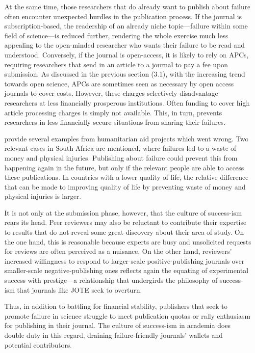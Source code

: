 \documentclass{article}
\begin{document}
At the same time, those researchers that do already want to publish about failure often encounter unexpected hurdles in the publication process. If the journal is subscription-based, the readership of an already niche topic—failure within some field of science—is reduced further, rendering the whole exercise much less appealing to the open-minded researcher who wants their failure to be read and understood. Conversely, if the journal is open-access, it is likely to rely on APCs, requiring researchers that send in an article to a journal to pay a fee upon submission. As discussed in the previous section (3.1), with the increasing trend towards open science, APCs are sometimes seen as necessary by open access journals to cover costs. However, these charges selectively disadvantage researchers at less financially prosperous institutions. Often funding to cover high article processing charges is simply not available. This, in turn, prevents researchers in less financially secure situations from sharing their failures.

\parencite{Sindall2020} provide several examples from humanitarian aid projects which went wrong. Two relevant cases in South Africa are mentioned, where failures led to a waste of money and physical injuries. Publishing about failure could prevent this from happening again in the future, but only if the relevant people are able to access these publications. In countries with a lower quality of life, the relative difference that can be made to improving quality of life by preventing waste of money and physical injuries is larger. 

It is not only at the submission phase, however, that the culture of success-ism rears its head. Peer reviewers may also be reluctant to contribute their expertise to results that do not reveal some great discovery about their area of study. On the one hand, this is reasonable because experts are busy and unsolicited requests for reviews are often perceived as a nuisance. On the other hand, reviewers' increased willingness to respond to larger-scale positive-publishing journals over smaller-scale negative-publishing ones reflects again the equating of experimental success with prestige—a relationship that undergirds the philosophy of success-ism that journals like JOTE seek to overturn. 

Thus, in addition to battling for financial stability, publishers that seek to promote failure in science struggle to meet publication quotas or rally enthusiasm for publishing in their journal. The culture of success-ism in academia does double duty in this regard, draining failure-friendly journals' wallets and potential contributors.
\end{document}
